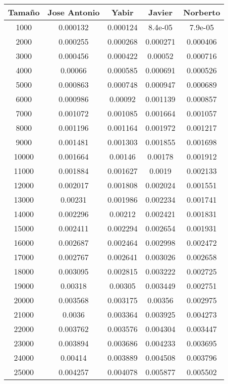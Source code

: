 \documentclass{article}
\begin{document}
\newpage
{}

\begin{tabular}{ | c | c  | c | c | c | }
  \hline
   Tama\~no & Jose Antonio & Yabir & Javier & Norberto\\ 
   \hline
1000	&	0.000132	&	0.000124	&	8.4e-05	&	7.9e-05	\\
2000	&	0.000255	&	0.000268	&	0.000271	&	0.000406	\\
3000	&	0.000456	&	0.000422	&	0.00052	&	0.000716	\\
4000	&	0.00066	&	0.000585	&	0.000691	&	0.000526	\\
5000	&	0.000863	&	0.000748	&	0.000947	&	0.000689	\\
6000	&	0.000986	&	0.00092	&	0.001139	&	0.000857	\\
7000	&	0.001072	&	0.001085	&	0.001664	&	0.001057	\\
8000	&	0.001196	&	0.001164	&	0.001972	&	0.001217	\\
9000	&	0.001481	&	0.001303	&	0.001855	&	0.001698	\\
10000	&	0.001664	&	0.00146	&	0.00178	&	0.001912	\\
11000	&	0.001884	&	0.001627	&	0.0019	&	0.002133	\\
12000	&	0.002017	&	0.001808	&	0.002024	&	0.001551	\\
13000	&	0.00231	&	0.001986	&	0.002234	&	0.001741	\\
14000	&	0.002296	&	0.00212	&	0.002421	&	0.001831	\\
15000	&	0.002411	&	0.002294	&	0.002654	&	0.001931	\\
16000	&	0.002687	&	0.002464	&	0.002998	&	0.002472	\\
17000	&	0.002767	&	0.002641	&	0.003026	&	0.002658	\\
18000	&	0.003095	&	0.002815	&	0.003222	&	0.002725	\\
19000	&	0.00318	&	0.00305	&	0.003449	&	0.002751	\\
20000	&	0.003568	&	0.003175	&	0.00356	&	0.002975	\\
21000	&	0.0036	&	0.003364	&	0.003925	&	0.004273	\\
22000	&	0.003762	&	0.003576	&	0.004304	&	0.003447	\\
23000	&	0.003894	&	0.003686	&	0.004233	&	0.003695	\\
24000	&	0.00414	&	0.003889	&	0.004508	&	0.003796	\\
25000	&	0.004257	&	0.004078	&	0.005877	&	0.005502	\\

  \hline
 \end{tabular}
 
\end{document}
